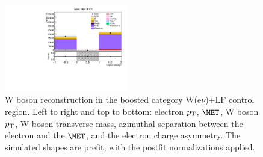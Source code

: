 \begin{figure}[tbp]
\begin{center}
    \includegraphics[width=0.48\textwidth]{figures/wlnhbb2016/boosted/WenWHLightFlavorFJCR_lepton1Charge.pdf}
    \caption{W boson reconstruction in the boosted category W(e$\nu$)+LF control region.
    Left to right and top to bottom: electron $p_{\mathrm{T}}$, $\MET$, W boson $p_{\mathrm{T}}$, W boson transverse mass,
    azimuthal separation between the electron and the $\MET$, and the electron charge asymmetry.
    The simulated shapes are prefit, with the postfit normalizations applied.}
    \label{fig:boost_WenLF_WBosons}
  \end{center}
\end{figure}
\clearpage

